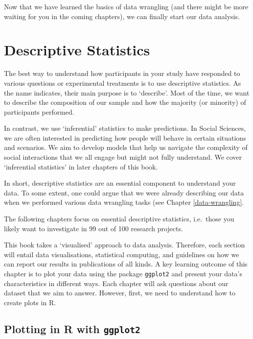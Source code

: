\documentclass[
]{book}
\begin{document}
Now that we have learned the basics of data wrangling (and there might be more waiting for you in the coming chapters), we can finally start our data analysis.

\hypertarget{descriptive-statistics}{%
\chapter{Descriptive Statistics}\label{descriptive-statistics}}

The best way to understand how participants in your study have responded to various questions or experimental treatments is to use descriptive statistics. As the name indicates, their main purpose is to `describe'. Most of the time, we want to describe the composition of our sample and how the majority (or minority) of participants performed.

In contrast, we use `inferential' statistics to make predictions. In Social Sciences, we are often interested in predicting how people will behave in certain situations and scenarios. We aim to develop models that help us navigate the complexity of social interactions that we all engage but might not fully understand. We cover `inferential statistics' in later chapters of this book.

In short, descriptive statistics are an essential component to understand your data. To some extent, one could argue that we were already describing our data when we performed various data wrangling tasks (see Chapter \ref{data-wrangling}.

The following chapters focus on essential descriptive statistics, i.e.~those you likely want to investigate in 99 out of 100 research projects.

This book takes a `visualised' approach to data analysis. Therefore, each section will entail data visualisations, statistical computing, and guidelines on how we can report our results in publications of all kinds. A key learning outcome of this chapter is to plot your data using the package \texttt{ggplot2} and present your data's characteristics in different ways. Each chapter will ask questions about our dataset that we aim to answer. However, first, we need to understand how to create plots in R.

\hypertarget{plotting-in-r-with-ggplot2}{%
\section{\texorpdfstring{Plotting in R with \texttt{ggplot2}}{Plotting in R with ggplot2}}\label{plotting-in-r-with-ggplot2}}
\end{document}
